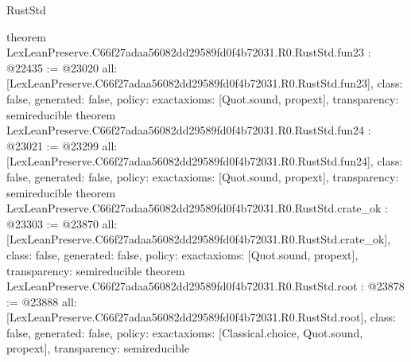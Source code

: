 \begin{lexlean}{RustStd}
\begin{coremodule}
{}
theorem LexLeanPreserve.C66f27adaa56082dd29589fd0f4b72031.R0.RustStd.fun23 : @22435 := @23020 {
  all: [LexLeanPreserve.C66f27adaa56082dd29589fd0f4b72031.R0.RustStd.fun23],
  class: false,
  generated: false,
  policy: exact{axioms: [Quot.sound, propext]},
  transparency: semireducible
}
theorem LexLeanPreserve.C66f27adaa56082dd29589fd0f4b72031.R0.RustStd.fun24 : @23021 := @23299 {
  all: [LexLeanPreserve.C66f27adaa56082dd29589fd0f4b72031.R0.RustStd.fun24],
  class: false,
  generated: false,
  policy: exact{axioms: [Quot.sound, propext]},
  transparency: semireducible
}
theorem LexLeanPreserve.C66f27adaa56082dd29589fd0f4b72031.R0.RustStd.crate_ok : @23303 := @23870 {
  all: [LexLeanPreserve.C66f27adaa56082dd29589fd0f4b72031.R0.RustStd.crate_ok],
  class: false,
  generated: false,
  policy: exact{axioms: [Quot.sound, propext]},
  transparency: semireducible
}
theorem LexLeanPreserve.C66f27adaa56082dd29589fd0f4b72031.R0.RustStd.root : @23878 := @23888 {
  all: [LexLeanPreserve.C66f27adaa56082dd29589fd0f4b72031.R0.RustStd.root],
  class: false,
  generated: false,
  policy: exact{axioms: [Classical.choice, Quot.sound, propext]},
  transparency: semireducible
}


\end{coremodule}
\end{lexlean}
